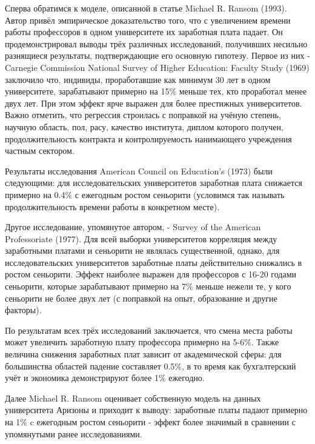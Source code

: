 \documentclass[a4paper, 12pt]{article}
\theoremstyle{definition}
\theoremstyle{plain}
\begin{document}
Сперва обратимся к моделе, описанной в статье Michael R. Ransom (1993). Автор привёл эмпирическое доказательство того, что с увеличением времени работы профессоров в одном университете их заработная плата падает. Он продемонстрировал выводы трёх различных исследований, получивших несильно разнящиеся результаты, подтверждающие его основную гипотезу. Первое из них - Carnegie Commission National Survey of Higher Education: Faculty Study (1969) заключило что, индивиды, проработавшие как минимум 30 лет в одном университете, зарабатывают примерно на 15\%  меньше тех, кто проработал менее двух лет. При этом эффект ярче выражен для более престижных университетов. Важно отметить, что регрессия строилась с поправкой на учёную степень, научную область, пол, расу, качество института, диплом которого получен, продолжительность контракта и контролируемость нанимающего учреждения частным сектором. 

	Результаты исследования American Council on Education's (1973) были следующими:  для исследовательских университетов заработная плата снижается примерно на 0.4\% с ежегодным ростом сеньорити (условимся так называть продолжительность времени работы в конкретном месте). 
	
	Другое исследование, упомянутое автором, - Survey of the American Professoriate (1977). Для всей выборки университетов корреляция между заработными платами и сеньорити не являлась существенной, однако, для исследовательских университетов заработные платы действительно снижались в ростом сеньорити. Эффект наиболее выражен для профессоров с 16-20 годами сеньорити, которые зарабатывают примерно на 7\% меньше нежели те, у кого сеньорити не более двух лет (с поправкой на опыт, образование и другие факторы). 
	
	По результатам всех трёх исследований заключается, что смена места работы может увеличить заработную плату профессора примерно на 5-6\%. Также величина снижения заработных плат зависит от академической сферы: для большинства областей падение составляет 0.5\%, в то время как бухгалтерский учёт и экономика демонстрируют более 1\% ежегодно. 
	
	Далее Michael R. Ransom оценивает собственную модель на данных университета Аризоны и приходит к выводу: заработные платы падают примерно на 1\% c ежегодным ростом сеньорити - эффект более значимый в сравнении с упомянутыми ранее исследованиями. 
	
\end{document}
